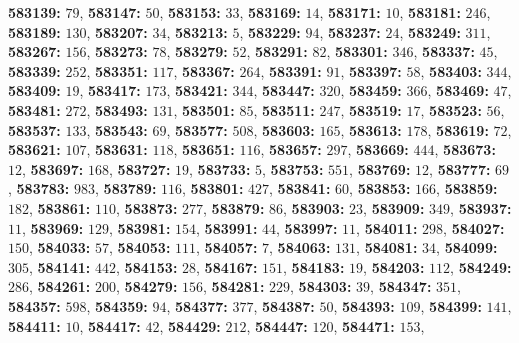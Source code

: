 \textsf{\bfseries 583139:} $79$, \textsf{\bfseries 583147:} $50$, \textsf{\bfseries 583153:} $33$, \textsf{\bfseries 583169:} $14$, \textsf{\bfseries 583171:} $10$, \textsf{\bfseries 583181:} $246$, \textsf{\bfseries 583189:} $130$, \textsf{\bfseries 583207:} $34$, \textsf{\bfseries 583213:} $5$, \textsf{\bfseries 583229:} $94$, \textsf{\bfseries 583237:} $24$, \textsf{\bfseries 583249:} $311$, \textsf{\bfseries 583267:} $156$, \textsf{\bfseries 583273:} $78$, \textsf{\bfseries 583279:} $52$, \textsf{\bfseries 583291:} $82$, \textsf{\bfseries 583301:} $346$, \textsf{\bfseries 583337:} $45$, \textsf{\bfseries 583339:} $252$, \textsf{\bfseries 583351:} $117$, \textsf{\bfseries 583367:} $264$, \textsf{\bfseries 583391:} $91$, \textsf{\bfseries 583397:} $58$, \textsf{\bfseries 583403:} $344$, \textsf{\bfseries 583409:} $19$, \textsf{\bfseries 583417:} $173$, \textsf{\bfseries 583421:} $344$, \textsf{\bfseries 583447:} $320$, \textsf{\bfseries 583459:} $366$, \textsf{\bfseries 583469:} $47$, \textsf{\bfseries 583481:} $272$, \textsf{\bfseries 583493:} $131$, \textsf{\bfseries 583501:} $85$, \textsf{\bfseries 583511:} $247$, \textsf{\bfseries 583519:} $17$, \textsf{\bfseries 583523:} $56$, \textsf{\bfseries 583537:} $133$, \textsf{\bfseries 583543:} $69$, \textsf{\bfseries 583577:} $508$, \textsf{\bfseries 583603:} $165$, \textsf{\bfseries 583613:} $178$, \textsf{\bfseries 583619:} $72$, \textsf{\bfseries 583621:} $107$, \textsf{\bfseries 583631:} $118$, \textsf{\bfseries 583651:} $116$, \textsf{\bfseries 583657:} $297$, \textsf{\bfseries 583669:} $444$, \textsf{\bfseries 583673:} $12$, \textsf{\bfseries 583697:} $168$, \textsf{\bfseries 583727:} $19$, \textsf{\bfseries 583733:} $5$, \textsf{\bfseries 583753:} $551$, \textsf{\bfseries 583769:} $12$, \textsf{\bfseries 583777:} $69$, \textsf{\bfseries 583783:} $983$, \textsf{\bfseries 583789:} $116$, \textsf{\bfseries 583801:} $427$, \textsf{\bfseries 583841:} $60$, \textsf{\bfseries 583853:} $166$, \textsf{\bfseries 583859:} $182$, \textsf{\bfseries 583861:} $110$, \textsf{\bfseries 583873:} $277$, \textsf{\bfseries 583879:} $86$, \textsf{\bfseries 583903:} $23$, \textsf{\bfseries 583909:} $349$, \textsf{\bfseries 583937:} $11$, \textsf{\bfseries 583969:} $129$, \textsf{\bfseries 583981:} $154$, \textsf{\bfseries 583991:} $44$, \textsf{\bfseries 583997:} $11$, \textsf{\bfseries 584011:} $298$, \textsf{\bfseries 584027:} $150$, \textsf{\bfseries 584033:} $57$, \textsf{\bfseries 584053:} $111$, \textsf{\bfseries 584057:} $7$, \textsf{\bfseries 584063:} $131$, \textsf{\bfseries 584081:} $34$, \textsf{\bfseries 584099:} $305$, \textsf{\bfseries 584141:} $442$, \textsf{\bfseries 584153:} $28$, \textsf{\bfseries 584167:} $151$, \textsf{\bfseries 584183:} $19$, \textsf{\bfseries 584203:} $112$, \textsf{\bfseries 584249:} $286$, \textsf{\bfseries 584261:} $200$, \textsf{\bfseries 584279:} $156$, \textsf{\bfseries 584281:} $229$, \textsf{\bfseries 584303:} $39$, \textsf{\bfseries 584347:} $351$, \textsf{\bfseries 584357:} $598$, \textsf{\bfseries 584359:} $94$, \textsf{\bfseries 584377:} $377$, \textsf{\bfseries 584387:} $50$, \textsf{\bfseries 584393:} $109$, \textsf{\bfseries 584399:} $141$, \textsf{\bfseries 584411:} $10$, \textsf{\bfseries 584417:} $42$, \textsf{\bfseries 584429:} $212$, \textsf{\bfseries 584447:} $120$, \textsf{\bfseries 584471:} $153$, 
